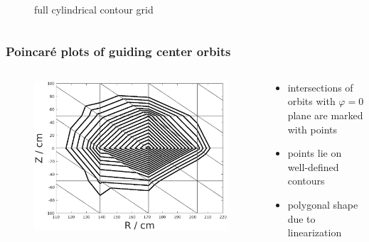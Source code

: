 \documentclass{beamer}
\begin{document}
\begin{frame}
\begin{columns}[onlytextwidth]
\begin{column}{0.5\textwidth}
\begin{center}
\begin{figure}
		\caption{full cylindrical contour grid}
	\end{figure}
\end{center}
	\end{column}
\end{columns}
\end{frame}

\begin{frame}
\frametitle{Poincaré plots of guiding center orbits}
\vspace{-0.75 cm}
\begin{columns}[onlytextwidth]
	\begin{column}{0.55\textwidth}
		\begin{center}
			\begin{figure}
				\includegraphics[trim={0cm 0cm 0cm 0cm},clip,width=1\textwidth]{FIGURES/field_lines_rect_grid2.eps}
				\caption{}
			\end{figure}
		\end{center}
	\end{column}
	\begin{column}{0.45\textwidth}
		\vspace{0 cm}
		\begin{center}
			\begin{itemize}
				\item intersections of orbits with $\varphi=0$ plane are marked with points
				\item points lie on well-defined contours
				\item polygonal shape due to linearization 
			\end{itemize}
		\end{center}
	\end{column}
\end{columns}
\end{frame}
\end{document}
